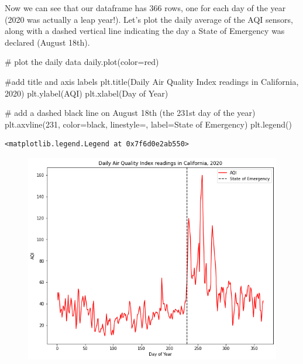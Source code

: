\documentclass[
  letterpaper,
  DIV=11,
  numbers=noendperiod]{scrreprt}
\newenvironment{Shaded}{\begin{snugshade}}{\end{snugshade}}
\newcommand{\CommentTok}[1]{\textcolor[rgb]{0.37,0.37,0.37}{#1}}
\newcommand{\DecValTok}[1]{\textcolor[rgb]{0.68,0.00,0.00}{#1}}
\newcommand{\NormalTok}[1]{\textcolor[rgb]{0.00,0.23,0.31}{#1}}
\newcommand{\OperatorTok}[1]{\textcolor[rgb]{0.37,0.37,0.37}{#1}}
\newcommand{\StringTok}[1]{\textcolor[rgb]{0.13,0.47,0.30}{#1}}
\begin{document}
Now we can see that our dataframe has 366 rows, one for each day of the
year (2020 was actually a leap year!). Let's plot the daily average of
the AQI sensors, along with a dashed vertical line indicating the day a
State of Emergency was declared (August 18th).

\begin{Shaded}
\begin{Highlighting}[]
\CommentTok{\# plot the daily data}
\NormalTok{daily.plot(color}\OperatorTok{=}\StringTok{\textquotesingle{}red\textquotesingle{}}\NormalTok{)}

\CommentTok{\#add title and axis labels}
\NormalTok{plt.title(}\StringTok{\textquotesingle{}Daily Air Quality Index readings in California, 2020\textquotesingle{}}\NormalTok{)}
\NormalTok{plt.ylabel(}\StringTok{\textquotesingle{}AQI\textquotesingle{}}\NormalTok{)}
\NormalTok{plt.xlabel(}\StringTok{\textquotesingle{}Day of Year\textquotesingle{}}\NormalTok{)}

\CommentTok{\# add a dashed black line on August 18th (the 231st day of the year)}
\NormalTok{plt.axvline(}\DecValTok{231}\NormalTok{, color}\OperatorTok{=}\StringTok{\textquotesingle{}black\textquotesingle{}}\NormalTok{, linestyle}\OperatorTok{=}\StringTok{\textquotesingle{}{-}{-}\textquotesingle{}}\NormalTok{, label}\OperatorTok{=}\StringTok{\textquotesingle{}State of Emergency\textquotesingle{}}\NormalTok{)}
\NormalTok{plt.legend()}
\end{Highlighting}
\end{Shaded}

\begin{verbatim}
<matplotlib.legend.Legend at 0x7f6d0e2ab550>
\end{verbatim}

\begin{figure}[H]

{\centering \includegraphics{notebooks/W03. Spatial Data_files/figure-pdf/cell-10-output-2.png}

}

\end{figure}
\end{document}
